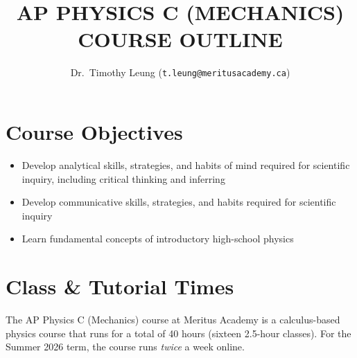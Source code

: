 \documentclass{../../oss-handout}
\title{AP PHYSICS C (MECHANICS) COURSE OUTLINE}
\author{Dr.\ Timothy Leung (\texttt{t.leung@meritusacademy.ca})}
\begin{document}
\thispagestyle{title}
\gentitle


\section{Course Objectives}
\begin{itemize}[nosep]
\item Develop analytical skills, strategies, and habits of mind required for
  scientific inquiry, including critical thinking and inferring
\item Develop communicative skills, strategies, and habits required for
  scientific inquiry
\item Learn fundamental concepts of introductory high-school physics
\end{itemize}






\section{Class \& Tutorial Times}

The AP Physics C (Mechanics) course at Meritus Academy is a calculus-based
physics course that runs for a total of 40 hours (sixteen 2.5-hour classes).
For the Summer 2026 term, the course runs \emph{twice} a week online.
\end{document}
